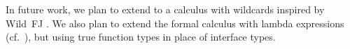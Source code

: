 In future work, we plan to extend \FGJGT to a calculus with wildcards
inspired by Wild~FJ \cite{TEP05}. 
We also plan to extend the formal calculus with lambda expressions
(cf.\ \cite{BBDGV18}), but using true function types in place of
interface types.


